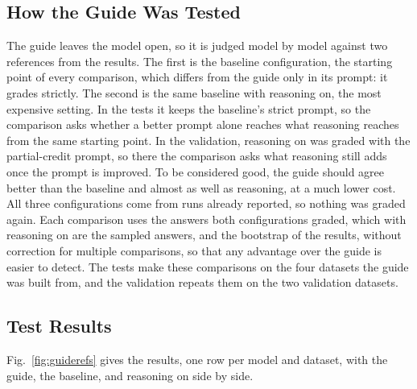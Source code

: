 \subsection{How the Guide Was Tested}
\label{sec:guidetests}

The guide leaves the model open, so it is judged model by model against two references from the results. The
first is the baseline configuration, the starting point of every comparison, which differs from the guide only in
its prompt: it grades strictly. The second is the same baseline with reasoning on, the most expensive setting. In the tests it keeps the baseline's strict prompt, so the comparison asks
whether a better prompt alone reaches what reasoning reaches from the same starting point. In the validation,
reasoning on was graded with the partial-credit prompt, so there the comparison asks what reasoning still adds once
the prompt is improved. To be
considered good, the guide should agree better than the baseline and almost as well as reasoning, at a much lower cost. All three
configurations come from runs already reported, so nothing was graded again. Each comparison uses the answers both
configurations graded, which with reasoning on are the sampled answers, and the bootstrap of the results, without
correction for multiple comparisons, so that any advantage over the guide is easier to detect. The tests make these
comparisons on the four datasets the guide was built from, and the validation repeats them on the two validation
datasets.

\subsection{Test Results}
\label{sec:guideuse}

Fig.~\ref{fig:guiderefs} gives the results, one row per model and dataset, with the guide, the baseline, and
reasoning on side by side.

